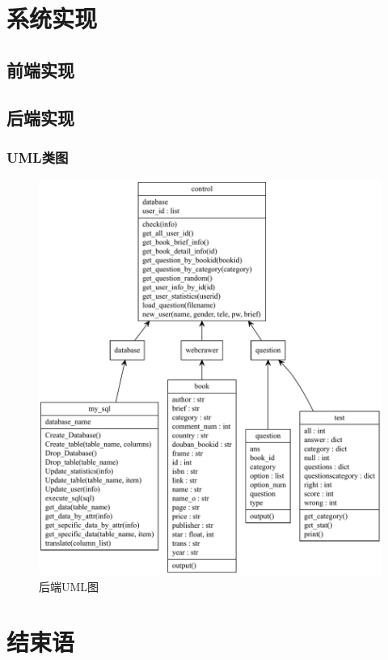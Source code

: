 \documentclass[twoside,11pt]{article}
\begin{document}
\section{系统实现}
\subsection{前端实现}
\subsection{后端实现}
\subsubsection{UML类图}
\begin{figure}[htbp]
    \includegraphics[width=1\columnwidth]{figures/backenduml.pdf}
    \caption{后端UML图}
    \label{fig:backenduml}
\end{figure}

\newpage
\section{结束语}
\end{document}
